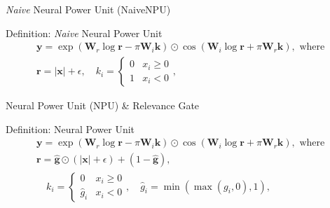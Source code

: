 \documentclass{beamer}
\newcommand{\Wre}{\bm W_{r}}
\newcommand{\Wim}{\bm W_{i}}
\begin{document}
\begin{frame}{\emph{Naive} Neural Power Unit (NaiveNPU)}
  \centering
  \resizebox{!}{.23\textwidth}{}
  \begin{block}{Definition: \emph{Naive} Neural Power Unit}
  \begin{gather*}
    \bm y = \exp(\Wre \log\bm r - \pi\Wim\bm k)
      \odot \cos(\Wim\log \bm r + \pi\Wre\bm k), \text{ where }\\
    \bm r = |\bm x| + \epsilon,
    \quad
    k_i = \begin{cases}
       0 & x_i \geq 0 \\
       1 & x_i < 0
    \end{cases},
  \end{gather*}
  \end{block} 
\end{frame}

\begin{frame}{Neural Power Unit (NPU) \& Relevance Gate}
  \resizebox{!}{.23\textwidth}{}
  \begin{block}{Definition: Neural Power Unit}
   \begin{gather*}
    \bm y = \exp(\Wre \log\bm r - \pi\Wim\bm k) 
          \odot \cos(\Wim\log \bm r + \pi\Wre\bm k), \text{ where } \\
    \bm r = \bm{\hat g} \odot (|\bm x|+\epsilon) + (1-\bm{\hat g}), \\
    \quad
    k_i = \begin{cases}
       0  & x_i \geq 0 \\
      \hat g_i & x_i < 0
    \end{cases},
    \quad
    \hat g_i = \min(\max(g_i,0),1),
   \end{gather*}
  \end{block}

\end{frame}
\end{document}
